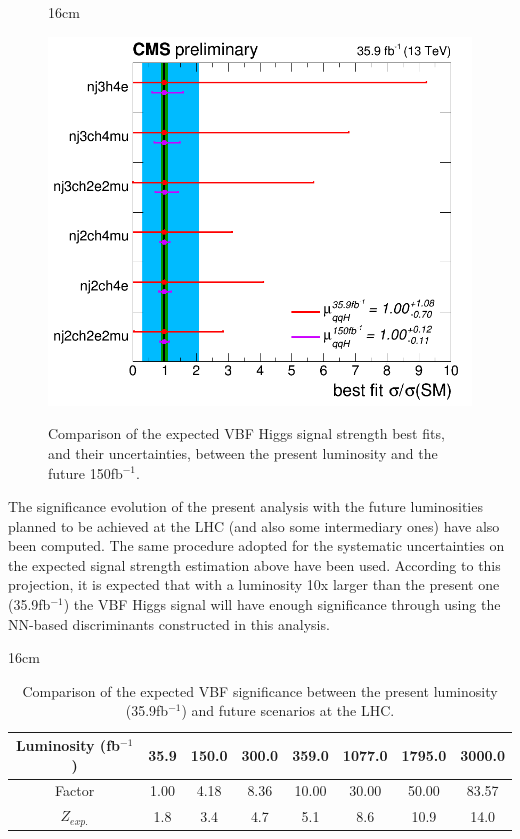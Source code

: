 \begin{figure}[hbtp]{16cm}
	\caption{Comparison of the expected VBF Higgs signal strength best fits, and their uncertainties, between the present luminosity and the future 150fb$^{-1}$.}	
	\centering
	\includegraphics[scale=0.3,trim={0.6cm 0cm 0.8cm 0cm},clip]{ChapterAnalysis/figs/ChannelsCompatibility_39fb_vs_150fb}
	\label{fig:vbf_signal_strengths_150fb}
\end{figure}

The significance evolution of the present analysis with the future luminosities planned to be achieved at the LHC (and also some intermediary ones) have also been computed. The same procedure adopted for the systematic uncertainties on the expected signal strength estimation above have been used. According to this projection, it is expected that with a luminosity 10x larger than the present one (35.9fb$^{-1}$) the VBF Higgs signal will have enough significance through using the NN-based discriminants constructed in this analysis.

\begin{table}[hbtp]{16cm}
	\caption{Comparison of the expected VBF significance between the present luminosity (35.9fb$^{-1}$) and future scenarios at the LHC.}
	\centering
	\begin{tabular}{c|c|c|c|c|c|c|c}
		\hline
		\rowcolor{light_gray}
		Luminosity (fb$^{-1}$) & 35.9 & 150.0 & 300.0 & 359.0 & 1077.0 & 1795.0 & 3000.0\\
		\hline
		\rowcolor{light_gray}
		Factor                 & 1.00 & 4.18  & 8.36  & 10.00 & 30.00  & 50.00  & 83.57\\
		\hline
		$Z_{exp.}$  & 1.8  & 3.4   & 4.7   & 5.1   & 8.6    & 10.9   & 14.0\\
		\hline
	\end{tabular}
	\label{tab:vbf_significance_vs_luminosities}
\end{table}

